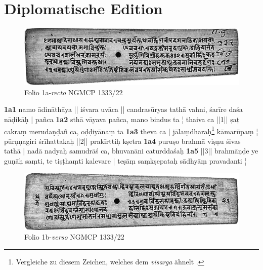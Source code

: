 \documentclass[a4paper,12pt]{article}
\begin{document}
\section{Diplomatische Edition}
\label{diped}
{\fontsize{11pt}{13}\selectfont
\begin{figure}[htbp] 
  \centering
     \includegraphics[width=1\textwidth]{1r.jpg}
  \caption{Folio 1a-\textit{recto} NGMCP 1333/22}
  \label{fig:Folio1a}
\end{figure}

\begin{flushleft}
\noindent
\textbf{1a1}  namo ādināthāya || iśvara uvāca || candrasūryas tathā vahni, śarīre daśa nāḍikāḥ | pañca \linebreak
\textbf{1a2} sthā vāyava pañca, mano bindus ta ¦  thaiva ca ||1|| ṣaṭ cakraṃ merudaṇḍañ ca, oḍḍiyānaṃ ta \linebreak
\textbf{1a3} theva ca | jālaṃdharaḥ\footnote{Vergleiche zu diesem Zeichen, welches dem \textit{visarga} ähnelt \parencite[18]{arbor2012}.} kāmarūpaṃ ¦  pūrṇṇagiri śrīhattakaḥ ||2|| prakīrttiḥ kṣetra \linebreak
\textbf{1a4} puruṣo brahmā viṣṇu śivas tathā |  nadā nadyaḥ samudrāś ca, bhuvanāni caturddaśaḥ \linebreak
\textbf{1a5} ||3|| brahmāṇḍe ye guṇāḥ saṃti, te tiṣṭhaṃti kalevare | teṣāṃ saṃkṣepataḥ sādhyāṃ pravadanti ¦ \linebreak 
\end{flushleft}

\begin{figure}[htbp] 
  \centering
     \includegraphics[width=1\textwidth]{1v.jpg}
  \caption{Folio 1b-\textit{verso} NGMCP 1333/22}
  \label{fig:Folio1b}
\end{figure}

}
\end{document}
